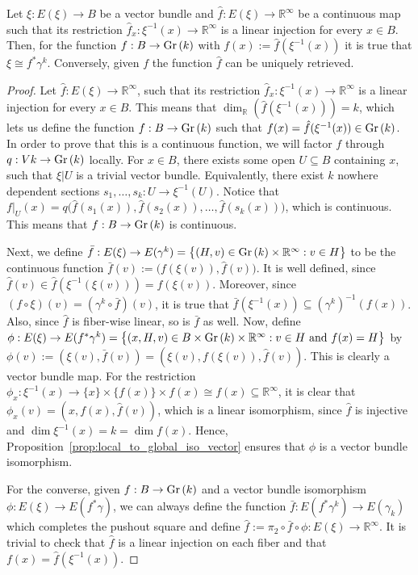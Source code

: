 \begin{lemma}\label{lem:injection_from_total_space} Let $\xi:E(\xi)\to B$ be a vector bundle and $\hat{f}:E(\xi)\to\mathbb{R}^{\infty}$ be a continuous map such that its restriction $\hat{f}_x:\xi^{-1}(x)\to\mathbb{R}^{\infty}$ is a linear injection for every $x\in B$. Then, for the function $f:B\to\Gr{k}$ with $f(x):=\hat{f}(\xi^{-1}(x))$ it is true that $\xi\cong f^*\gamma^k$. Conversely, given $f$ the function $\hat{f}$ can be uniquely retrieved.
\end{lemma}
\begin{proof} Let $\hat{f}:E(\xi)\to\mathbb{R}^{\infty}$, such that its restriction $\hat{f}_x:\xi^{-1}(x)\to\mathbb{R}^{\infty}$ is a linear injection for every $x\in B$. This means that $\dim_{\mathbb{R}}(\hat{f}(\xi^{-1}(x)))=k$, which lets us define the function $f:B\to\Gr{k}$ such that $f(x)=\hat{f}(\xi^{-1}(x))\in\Gr{k}$. In order to prove that this is a continuous function, we will factor $f$ through $q:V{k}\to\Gr{k}$ locally. For $x\in B$, there exists some open $U\subseteq B$ containing $x$, such that $\xi|U$ is a trivial vector bundle. Equivalently, there exist $k$ nowhere dependent sections $s_1,\ldots,s_k:U\to\xi^{-1}(U)$. Notice that $f|_U(x)=q\big(\hat{f}(s_1(x)),\hat{f}(s_2(x)),\ldots,\hat{f}(s_k(x))\big)$, which is continuous. This means that $f:B\to\Gr{k}$ is continuous.

Next, we define $\bar{f}:E(\xi)\to E(\gamma^k)=\big\{(H,v)\in\Gr{k}\times\mathbb{R}^{\infty}:v\in H\big\}$ to be the continuous function $\bar{f}(v):=\big(f(\xi(v)),\hat{f}(v)\big)$. It is well defined, since $\hat{f}(v)\in\hat{f}(\xi^{-1}(\xi(v)))=f(\xi(v))$. Moreover, since $(f\circ\xi)(v)=(\gamma^k\circ\bar{f})(v)$, it is true that $\bar{f}(\xi^{-1}(x))\subseteq(\gamma^k)^{-1}(f(x))$. Also, since $\hat{f}$ is fiber-wise linear, so is $\bar{f}$ as well. Now, define $\phi:E(\xi)\to E(f^*\gamma^k)=\big\{(x,H,v)\in B\times\Gr{k}\times\mathbb{R}^{\infty}:v\in H\text{ and }f(x)=H\big\}$ by $\phi(v):=(\xi(v),\bar{f}(v))=(\xi(v),f(\xi(v)),\hat{f}(v))$. This is clearly a vector bundle map. For the restriction $\phi_x:\xi^{-1}(x)\to\{x\}\times\{f(x)\}\times f(x)\cong f(x)\subseteq\mathbb{R}^{\infty}$, it is clear that $\phi_x(v)=(x,f(x),\hat{f}(v))$, which is a linear isomorphism, since $\hat{f}$ is injective and $\dim\xi^{-1}(x)=k=\dim f(x)$. Hence, Proposition~\ref{prop:local_to_global_iso_vector} ensures that $\phi$ is a vector bundle isomorphism.

For the converse, given $f:B\to\Gr{k}$ and a vector bundle isomorphism $\phi:E(\xi)\to E(f^*\gamma)$, we can always define the function $\bar{f}:E(f^*\gamma^k)\to E(\gamma_k)$ which completes the pushout square and define $\hat{f}:=\pi_2\circ\bar{f}\circ\phi:E(\xi)\to\mathbb{R}^{\infty}$. It is trivial to check that $\hat{f}$ is a linear injection on each fiber and that $f(x)=\hat{f}(\xi^{-1}(x))$.
\end{proof}

